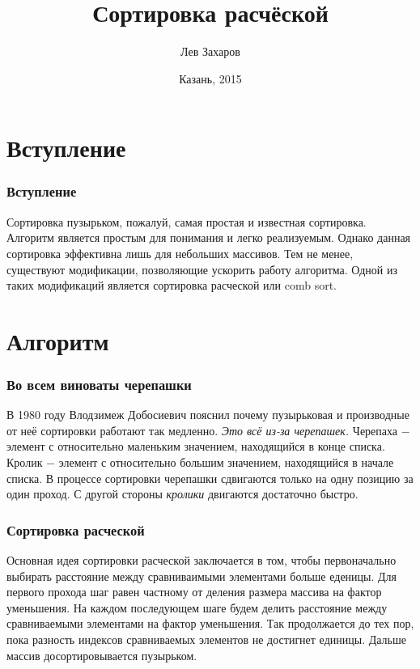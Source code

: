 \documentclass{beamer}
\newcommand{\br}{\pause \linebreak \linebreak}
\newcommand{\nl}{\pause \linebreak}
\begin{document}
\title{Сортировка расчёской}
\author{Лев Захаров}
\date{Казань, 2015}
\frame{\titlepage}

\section{Вступление}
\begin{frame}
    \frametitle{Вступление}
        Сортировка пузырьком, пожалуй, самая простая и известная сортировка. Алгоритм является простым для понимания и легко реализуемым.
        Однако данная сортировка эффективна лишь для небольших массивов. Тем не менее, существуют модификации, позволяющие ускорить работу алгоритма.
        Одной из таких модификаций является \alert{сортировка расческой} или \alert{comb sort}.
\end{frame}

\section{Алгоритм}
\begin{frame}
    \frametitle{Во всем виноваты черепашки}
        В 1980 году Влодзимеж Добосиевич пояснил почему пузырьковая и производные от неё сортировки работают так медленно. \textit{Это всё из-за черепашек.}
        \br
        \alert{Черепаха} $-$ элемент с относительно маленьким значением, находящийся в конце списка.
        \nl
        \alert{Кролик} $-$ элемент с относительно большим значением, находящийся в начале списка.
        \br
        В процессе сортировки черепашки сдвигаются только на одну позицию за один проход. С другой стороны \textit{кролики} двигаются достаточно быстро.

\end{frame}

\begin{frame}
    \frametitle{Сортировка расческой}
    Основная идея сортировки расческой заключается в том, чтобы первоначально выбирать расстояние между сравниваимыми элементами больше еденицы.
    \br
    Для первого прохода шаг равен частному от деления размера массива на \alert{фактор уменьшения}.
    \nl
    На каждом последующем шаге будем делить расстояние между сравниваемыми элементами на \alert{фактор уменьшения}.
    \br
    Так продолжается до тех пор, пока разность индексов сравниваемых элементов не достигнет единицы.
    Дальше массив досортировывается пузырьком.
\end{frame}
\end{document}
